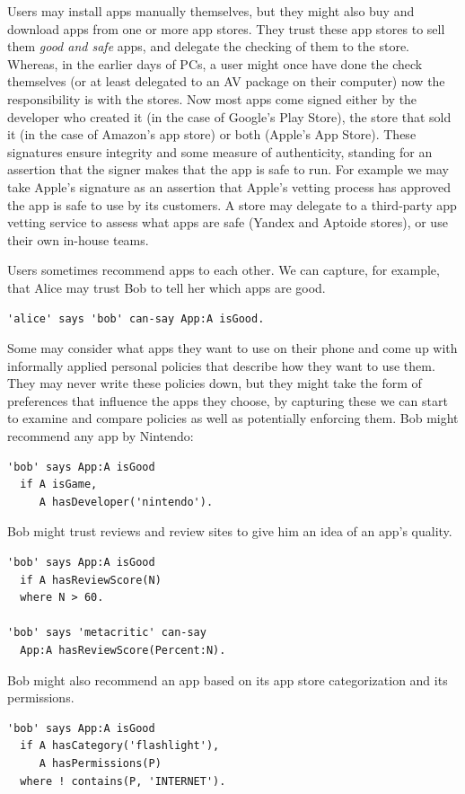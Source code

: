 \documentclass[thesis.tex]{subfiles}
\begin{document}
Users may install apps manually themselves, but they might also buy and download
apps from one or more app stores. They trust these app stores to sell them
\emph{good and safe} apps, and delegate the checking of them to the store.
Whereas, in the earlier days of PCs, a user might once have done the check
themselves (or at least delegated to an \ac{AV} package on their computer) now
the responsibility is with the stores. Now most apps come signed either by the
developer who created it (in the case of Google's Play Store), the store that
sold it (in the case of Amazon's app store) or both (Apple's App Store). These
signatures ensure integrity and some measure of authenticity, standing for an
assertion that the signer makes that the app is safe to run. For example we may
take Apple's signature as an assertion that Apple's vetting process has approved
the app is safe to use by its customers. A store may delegate to a third-party
app vetting service to assess what apps are safe (Yandex and Aptoide stores), or
use their own in-house teams.

Users sometimes recommend apps to each other. We can capture, for example, that
Alice may trust Bob to tell her which apps are good.
%
\begin{lstlisting}
'alice' says 'bob' can-say App:A isGood.
\end{lstlisting}
%
Some may consider what apps they want to use on their phone and come up with
informally applied personal policies that describe how they want to use them.
They may never write these policies down, but they might take the form of
preferences that influence the apps they choose, by capturing these we can start
to examine and compare policies as well as potentially enforcing them. Bob might recommend any app by Nintendo:
%
\begin{lstlisting}
'bob' says App:A isGood
  if A isGame,
     A hasDeveloper('nintendo').
\end{lstlisting}
%
Bob might trust reviews and review sites to give him an idea of an app's quality. 
%
\begin{lstlisting}
'bob' says App:A isGood
  if A hasReviewScore(N)
  where N > 60.
 
'bob' says 'metacritic' can-say
  App:A hasReviewScore(Percent:N).
\end{lstlisting}
%
Bob might also recommend an app based on its app store categorization and its permissions.
%
\begin{lstlisting}
'bob' says App:A isGood
  if A hasCategory('flashlight'),
     A hasPermissions(P)
  where ! contains(P, 'INTERNET').
\end{lstlisting}
\end{document}
